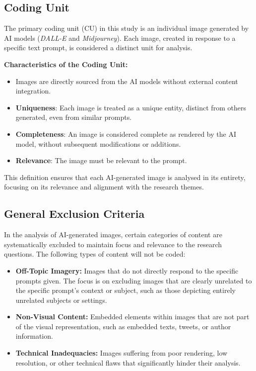 \subsection{Coding Unit}
The primary coding unit (CU) in this study is an individual image generated by AI models (\textit{DALL-E} and \textit{Midjourney}). Each image, created in response to a specific text prompt, is considered a distinct unit for analysis.

\textbf{Characteristics of the Coding Unit:
}
\begin{itemize}
    \item Images are directly sourced from the AI models without external content integration.
    \item \textbf{Uniqueness}: Each image is treated as a unique entity, distinct from others generated, even from similar prompts.
    \item \textbf{Completeness}: An image is considered complete as rendered by the AI model, without subsequent modifications or additions.
    \item \textbf{Relevance}: The image must be relevant to the prompt.
\end{itemize}

This definition ensures that each AI-generated image is analysed in its entirety, focusing on its relevance and alignment with the research themes.

\subsection{General Exclusion Criteria}
In the analysis of AI-generated images, certain categories of content are systematically excluded to maintain focus and relevance to the research questions. The following types of content will not be coded:

\begin{itemize}
    \item \textbf{Off-Topic Imagery:} Images that do not directly respond to the specific prompts given. The focus is on excluding images that are clearly unrelated to the specific prompt's context or subject, such as those depicting entirely unrelated subjects or settings.
    \item \textbf{Non-Visual Content:} Embedded elements within images that are not part of the visual representation, such as embedded texts, tweets, or author information.
    \item \textbf{Technical Inadequacies:} Images suffering from poor rendering, low resolution, or other technical flaws that significantly hinder their analysis.
\end{itemize}

